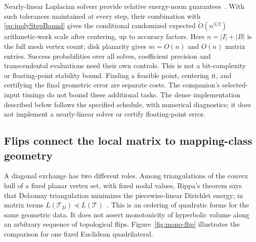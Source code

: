 Nearly-linear Laplacian solvers provide relative energy-norm
guarantees~\cite[Theorem~5.5]{SpielmanTengSolvers}. With such tolerances
maintained at every step, their combination with
\eqref{eq:ipolyStepBound} gives the conditional randomized expected
$\widetilde O(n^{3/2})$ arithmetic-work scale after centering, up to
accuracy factors. Here $n=|I|+|B|$ is the full mesh vertex count;
disk planarity gives $m=O(n)$ and $O(n)$ matrix entries.
Success probabilities over all solves,
coefficient precision and transcendental evaluations need their own
controls. This is not a bit-complexity or floating-point stability
bound. Finding a feasible point, centering it, and certifying the final
geometric error are separate costs. The companion's selected-input
timings do not bound these additional tasks. The dense implementation
described below follows the specified schedule, with numerical diagnostics;
it does not implement a nearly-linear solver or certify floating-point error.

\subsection{Flips connect the local matrix to mapping-class geometry}
\label{subsec:ipolyFlips}

A diagonal exchange has two different roles. Among triangulations of
the convex hull of a fixed planar vertex set, with fixed nodal values,
Rippa's theorem says that Delaunay
triangulation minimizes the piecewise-linear Dirichlet energy; in matrix
terms $L(\mathcal T_D)\preccurlyeq L(\mathcal T)$~\cite{RippaEnergy}.
This is an ordering of quadratic forms for the same geometric data.
It does not assert monotonicity of hyperbolic volume along an arbitrary
sequence of topological flips.
Figure~\ref{fig:mono-flip} illustrates the comparison for one fixed
Euclidean quadrilateral.

